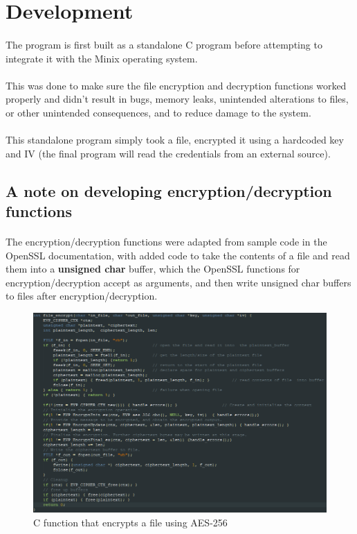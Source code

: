 \documentclass{article}
\begin{document}
\section{Development}
    \paragraph{}The program is first built as a standalone C program before attempting to integrate it with the Minix operating system. 
    \paragraph{}This was done to make sure the file encryption and decryption functions worked properly and didn't result in bugs, memory leaks, unintended alterations to files, or other unintended consequences, and to reduce damage to the system.
    \paragraph{}This standalone program simply took a file, encrypted it using a hardcoded key and IV (the final program will read the credentials from an external source).

    \subsection{A note on developing encryption/decryption functions}
        \paragraph{}The encryption/decryption functions were adapted from sample code in the OpenSSL documentation, with added code to take the contents of a file and read them into a \textbf{unsigned char} buffer, which the OpenSSL functions for encryption/decryption accept as arguments, and then write unsigned char buffers to files after encryption/decryption.

        \begin{figure}[htbp]
            \centering\includegraphics[width=\textwidth]{encrypt_function_screenshot_1.png}
            \caption{C function that encrypts a file using AES-256}
            \label{fig:my_label}
        \end{figure}
    \newpage
\end{document}
